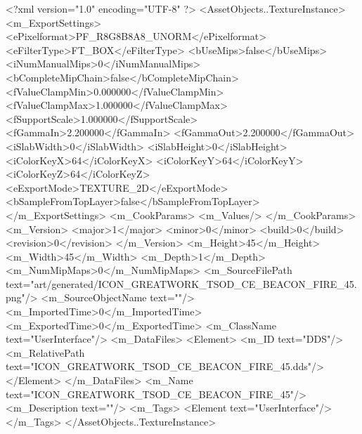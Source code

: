 <?xml version="1.0" encoding="UTF-8" ?>
<AssetObjects..TextureInstance>
	<m_ExportSettings>
		<ePixelformat>PF_R8G8B8A8_UNORM</ePixelformat>
		<eFilterType>FT_BOX</eFilterType>
		<bUseMips>false</bUseMips>
		<iNumManualMips>0</iNumManualMips>
		<bCompleteMipChain>false</bCompleteMipChain>
		<fValueClampMin>0.000000</fValueClampMin>
		<fValueClampMax>1.000000</fValueClampMax>
		<fSupportScale>1.000000</fSupportScale>
		<fGammaIn>2.200000</fGammaIn>
		<fGammaOut>2.200000</fGammaOut>
		<iSlabWidth>0</iSlabWidth>
		<iSlabHeight>0</iSlabHeight>
		<iColorKeyX>64</iColorKeyX>
		<iColorKeyY>64</iColorKeyY>
		<iColorKeyZ>64</iColorKeyZ>
		<eExportMode>TEXTURE_2D</eExportMode>
		<bSampleFromTopLayer>false</bSampleFromTopLayer>
	</m_ExportSettings>
	<m_CookParams>
		<m_Values/>
	</m_CookParams>
	<m_Version>
		<major>1</major>
		<minor>0</minor>
		<build>0</build>
		<revision>0</revision>
	</m_Version>
	<m_Height>45</m_Height>
	<m_Width>45</m_Width>
	<m_Depth>1</m_Depth>
	<m_NumMipMaps>0</m_NumMipMaps>
	<m_SourceFilePath text="art/generated/ICON_GREATWORK_TSOD_CE_BEACON_FIRE_45.png"/>
	<m_SourceObjectName text=""/>
	<m_ImportedTime>0</m_ImportedTime>
	<m_ExportedTime>0</m_ExportedTime>
	<m_ClassName text="UserInterface"/>
	<m_DataFiles>
		<Element>
			<m_ID text="DDS"/>
			<m_RelativePath text="ICON_GREATWORK_TSOD_CE_BEACON_FIRE_45.dds"/>
		</Element>
	</m_DataFiles>
	<m_Name text="ICON_GREATWORK_TSOD_CE_BEACON_FIRE_45"/>
	<m_Description text=""/>
	<m_Tags>
		<Element text="UserInterface"/>
	</m_Tags>
</AssetObjects..TextureInstance>
